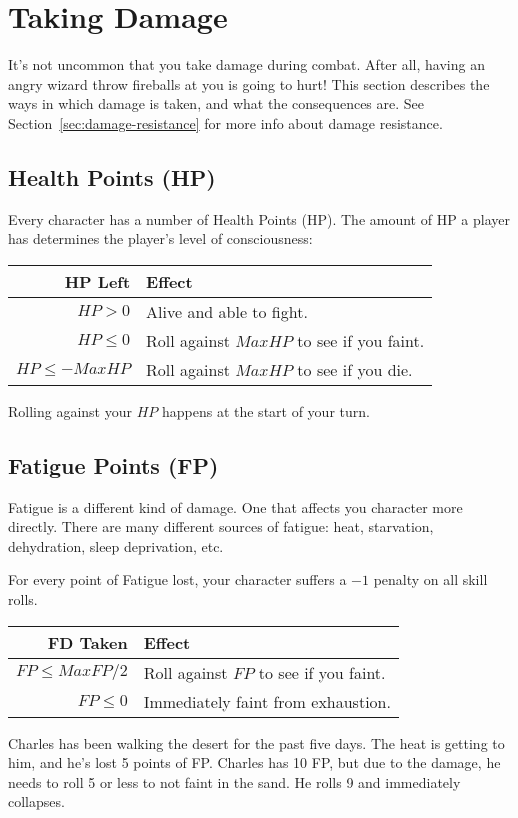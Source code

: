 \section{Taking Damage}
It's not uncommon that you take damage during combat.
After all, having an angry wizard throw fireballs at you is going to hurt!
This section describes the ways in which damage is taken, and what the consequences are.
See Section~\ref{sec:damage-resistance} for more info about damage resistance.

\subsection{Health Points (HP)}\label{sec:health-points}
Every character has a number of Health Points (HP).
The amount of HP a player has determines the player's level of consciousness:

\begin{center}
  \begin{tabular}{r | l}
    \textbf{HP Left} & \textbf{Effect} \\\hline
    $HP > 0$         & Alive and able to fight. \\
    $HP \leq 0$      & Roll against $MaxHP$ to see if you faint. \\
    $HP \leq -MaxHP$ & Roll against $MaxHP$ to see if you die.
  \end{tabular}
\end{center}

\begin{note} 
  Rolling against your $HP$ happens at the start of your turn.
\end{note}
  
\subsection{Fatigue Points (FP)}\label{sec:fatigue-points}
Fatigue is a different kind of damage.
One that affects you character more directly.
There are many different sources of fatigue: heat, starvation, dehydration, sleep deprivation, etc.

For every point of Fatigue lost, your character suffers a $-1$ penalty on all skill rolls.

\begin{center}
  \begin{tabular}{r | l}
    \textbf{FD Taken} & \textbf{Effect} \\\hline
    $FP \leq MaxFP/2$ & Roll against $FP$ to see if you faint. \\
    $FP \leq 0$   & Immediately faint from exhaustion.
  \end{tabular}
\end{center}

\begin{example}
  Charles has been walking the desert for the past five days.
  The heat is getting to him, and he's lost 5 points of FP.
  Charles has 10 FP, but due to the damage, he needs to roll 5 or less to not faint in the sand.
  He rolls 9 and immediately collapses.
\end{example}